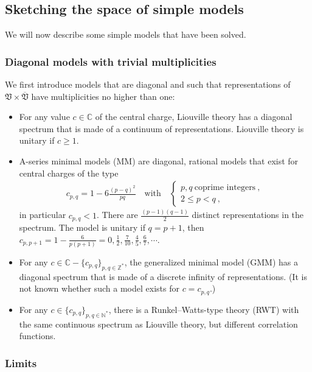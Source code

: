 \documentclass[12pt, a4paper, notitlepage, twoside]{report}
\numberwithin{equation}{section}
\theoremstyle{break}
\begin{document}
\subsection{Sketching the space of simple models \label{secmomo}}

We will now describe some simple models that have been solved.

\subsubsection{Diagonal models with trivial multiplicities}

We first introduce models that are diagonal and such that representations of $\mathfrak{V}\times \overline{\mathfrak{V}}$ have multiplicities no higher than one:
\begin{itemize}
 \item For any value $c\in\mathbb{C}$ of the central charge, Liouville theory
has a diagonal spectrum that is made of a continuum of representations.
Liouville theory is unitary if $c\geq 1$. 
\item A-series minimal models (MM) are diagonal, rational models that exist for central charges of the type
\begin{align}
 c_{p,q} = 1 - 6 \frac{(p-q)^2}{pq}  \quad \text{with} \quad \left\{\begin{array}{l}  p,q \ \text{coprime  integers}\ , \\ 2\leq p<q\ , \end{array}\right.  
\label{cpq}
\end{align}
in particular $c_{p,q} <1$.
There are $\frac{(p-1)(q-1)}{2}$ distinct representations in the spectrum.
The model is unitary if $q=p+1$, then $c_{p,p+1}=1-\frac{6}{p(p+1)}=0,\frac12,\frac{7}{10},\frac45, \frac67,\cdots$.
\item For any  $c\in\mathbb{C}-\{c_{p,q}\}_{p,q\in\mathbb{Z}^*}$, the generalized minimal model (GMM) has a diagonal spectrum that is made of a discrete infinity of representations. (It is not known whether such a model exists for $c=c_{p,q}$.)
\item For any $c\in \{c_{p,q}\}_{p,q\in\mathbb{N}^*}$, there is a Runkel--Watts-type theory (RWT) with the same continuous spectrum as Liouville theory, but different correlation functions. 
\end{itemize}

\subsubsection{Limits}
\end{document}
